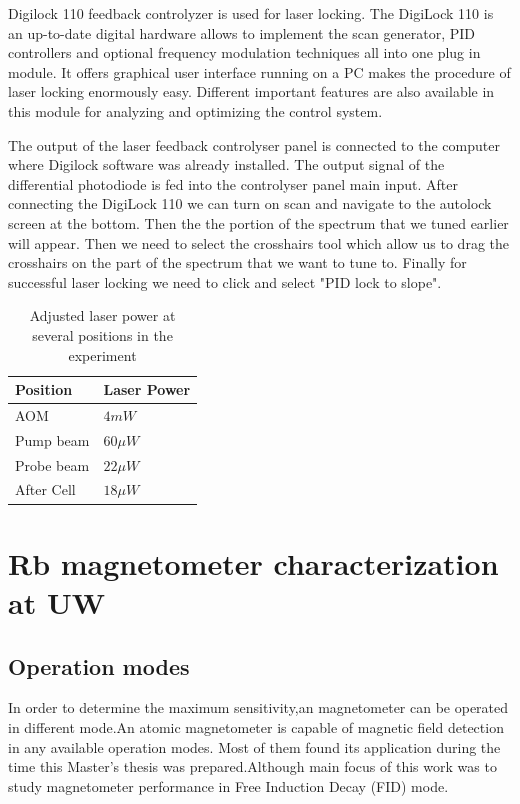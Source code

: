 \documentclass[12pt]{report}
\begin{document}
Digilock 110 feedback controlyzer is used for laser locking. The DigiLock 110 is an up-to-date digital hardware allows to implement the scan generator, PID controllers and optional frequency modulation techniques all into one plug in module. It offers graphical user interface running on a PC makes the procedure of laser locking enormously easy. Different important features are also available in this module for analyzing and optimizing the control system.
 
The output of the laser feedback controlyser panel is connected to the computer where Digilock software was already installed. The output signal of the differential photodiode is fed into the controlyser panel main input. After connecting the DigiLock 110 we can turn on scan and navigate to the autolock screen at the bottom. Then the the portion of the spectrum that we tuned earlier will appear. Then we need to select the crosshairs tool which allow us to drag the crosshairs on the part of the spectrum that we want to tune to. Finally for successful laser locking we need to click and select "PID lock to slope".
\begin{table}[h]
\centering
\begin{tabular}{|l | l|}
\hline

\textbf{ Position}    & \textbf{Laser Power} \\
\hline

AOM &   $4mW$  \\

Pump beam   &    $60\mu W$  \\

Probe beam   &    $22\mu W$  \\
After Cell  &      $18\mu W$   \\

\hline
\end{tabular}
\caption{Adjusted laser power at several positions in the experiment}
\end{table}

\chapter{Rb magnetometer characterization at UW}
\section{Operation modes}

 In order to determine the maximum sensitivity,an magnetometer can be operated in different mode.An atomic
magnetometer is capable of magnetic field detection in any available operation modes. Most of them found its application during the time this Master's thesis was prepared.Although main focus of this work was to study magnetometer performance in Free Induction Decay (FID) mode.
\end{document}

